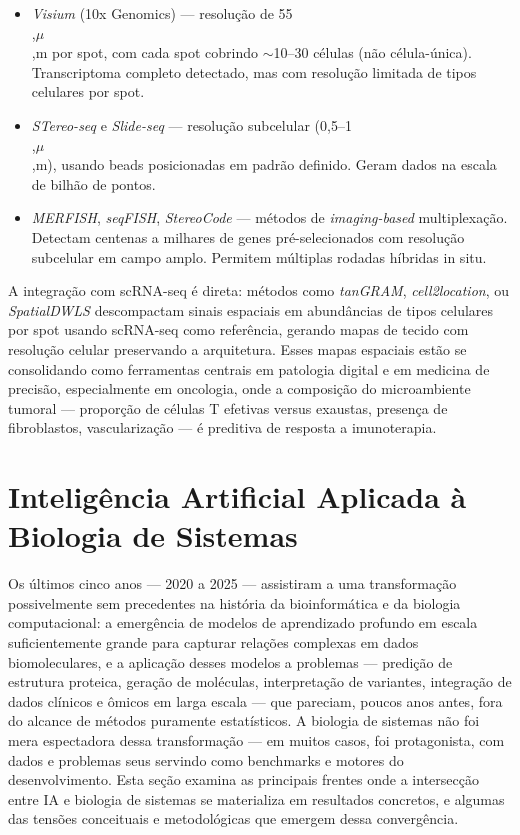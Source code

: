 \begin{itemize}
  \item \emph{Visium} (10x Genomics) --- resolução de 55\\,\(\mu\)\\,m por spot, com cada spot cobrindo \(\sim\)10--30 células (não célula-única). Transcriptoma completo detectado, mas com resolução limitada de tipos celulares por spot.
  \item \emph{STereo-seq} e \emph{Slide-seq} --- resolução subcelular (0,5--1\\,\(\mu\)\\,m), usando beads posicionadas em padrão definido. Geram dados na escala de bilhão de pontos.
  \item \emph{MERFISH}, \emph{seqFISH}, \emph{StereoCode} --- métodos de \emph{imaging-based} multiplexação. Detectam centenas a milhares de genes pré-selecionados com resolução subcelular em campo amplo. Permitem múltiplas rodadas híbridas in situ.
\end{itemize}

A integração com scRNA-seq é direta: métodos como \emph{tanGRAM}, \emph{cell2location}, ou \emph{SpatialDWLS} descompactam sinais espaciais em abundâncias de tipos celulares por spot usando scRNA-seq como referência, gerando mapas de tecido com resolução celular preservando a arquitetura. Esses mapas espaciais estão se consolidando como ferramentas centrais em patologia digital e em medicina de precisão, especialmente em oncologia, onde a composição do microambiente tumoral --- proporção de células T efetivas versus exaustas, presença de fibroblastos, vascularização --- é preditiva de resposta a imunoterapia.



\section{Inteligência Artificial Aplicada à Biologia de Sistemas}
\label{sec:15-ia}

Os últimos cinco anos --- 2020 a 2025 --- assistiram a uma transformação possivelmente sem precedentes na história da bioinformática e da biologia computacional: a emergência de modelos de aprendizado profundo em escala suficientemente grande para capturar relações complexas em dados biomoleculares, e a aplicação desses modelos a problemas --- predição de estrutura proteica, geração de moléculas, interpretação de variantes, integração de dados clínicos e ômicos em larga escala --- que pareciam, poucos anos antes, fora do alcance de métodos puramente estatísticos. A biologia de sistemas não foi mera espectadora dessa transformação --- em muitos casos, foi protagonista, com dados e problemas seus servindo como benchmarks e motores do desenvolvimento. Esta seção examina as principais frentes onde a intersecção entre IA e biologia de sistemas se materializa em resultados concretos, e algumas das tensões conceituais e metodológicas que emergem dessa convergência.


